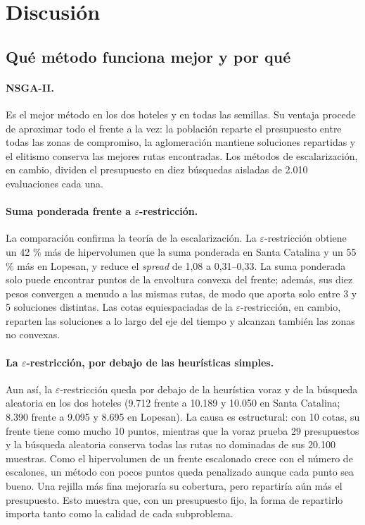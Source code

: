 \section{Discusión}
\label{sec:discusion}

\subsection{Qué método funciona mejor y por qué}

\paragraph{NSGA-II.} Es el mejor método en los dos hoteles y en todas las semillas. Su ventaja procede de aproximar todo el frente a la vez: la población reparte el presupuesto entre todas las zonas de compromiso, la aglomeración mantiene soluciones repartidas y el elitismo conserva las mejores rutas encontradas. Los métodos de escalarización, en cambio, dividen el presupuesto en diez búsquedas aisladas de 2.010 evaluaciones cada una.

\paragraph{Suma ponderada frente a $\varepsilon$-restricción.} La comparación confirma la teoría de la escalarización. La $\varepsilon$-restricción obtiene un 42 \% más de hipervolumen que la suma ponderada en Santa Catalina y un 55 \% más en Lopesan, y reduce el \emph{spread} de 1,08 a 0,31--0,33. La suma ponderada solo puede encontrar puntos de la envoltura convexa del frente; además, sus diez pesos convergen a menudo a las mismas rutas, de modo que aporta solo entre 3 y 5 soluciones distintas. Las cotas equiespaciadas de la $\varepsilon$-restricción, en cambio, reparten las soluciones a lo largo del eje del tiempo y alcanzan también las zonas no convexas.

\paragraph{La $\varepsilon$-restricción, por debajo de las heurísticas simples.} Aun así, la $\varepsilon$-restricción queda por debajo de la heurística voraz y de la búsqueda aleatoria en los dos hoteles (9.712 frente a 10.189 y 10.050 en Santa Catalina; 8.390 frente a 9.095 y 8.695 en Lopesan). La causa es estructural: con 10 cotas, su frente tiene como mucho 10 puntos, mientras que la voraz prueba 29 presupuestos y la búsqueda aleatoria conserva todas las rutas no dominadas de sus 20.100 muestras. Como el hipervolumen de un frente escalonado crece con el número de escalones, un método con pocos puntos queda penalizado aunque cada punto sea bueno. Una rejilla más fina mejoraría su cobertura, pero repartiría aún más el presupuesto. Esto muestra que, con un presupuesto fijo, la forma de repartirlo importa tanto como la calidad de cada subproblema.

